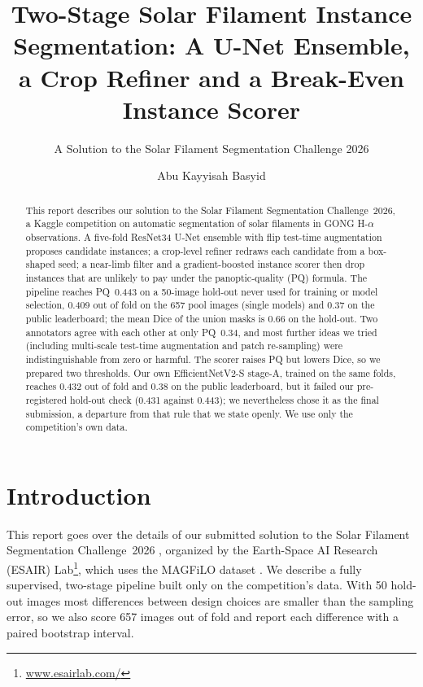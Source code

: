 \documentclass[sigconf]{acmart}
\begin{document}
\title[Two-Stage Solar Filament Segmentation]{Two-Stage Solar Filament Instance Segmentation: A U-Net Ensemble, a Crop Refiner and a Break-Even Instance Scorer}
\subtitle{A Solution to the Solar Filament Segmentation Challenge 2026} %

\author{Abu Kayyisah Basyid}

\begin{abstract}
    This report describes our solution to the Solar Filament Segmentation Challenge~2026, a Kaggle competition on automatic segmentation of solar filaments in GONG H-$\alpha$ observations.
    A five-fold ResNet34 U-Net ensemble with flip test-time augmentation proposes candidate instances; a crop-level refiner redraws each candidate from a box-shaped seed; a near-limb filter and a gradient-boosted instance scorer then drop instances that are unlikely to pay under the panoptic-quality (PQ) formula. The pipeline reaches PQ~0.443 on a 50-image hold-out never used for training or model selection, 0.409 out of fold on the 657 pool images (single models) and 0.37 on the public leaderboard; the mean Dice of the union masks is 0.66 on the hold-out. Two annotators agree with each other at only PQ~0.34, and most further ideas we tried (including multi-scale test-time augmentation and patch re-sampling) were indistinguishable from zero or harmful. The scorer raises PQ but lowers Dice, so we prepared two thresholds. Our own EfficientNetV2-S stage-A, trained on the same folds, reaches 0.432 out of fold and 0.38 on the public leaderboard, but it failed our pre-registered hold-out check (0.431 against 0.443); we nevertheless chose it as the final submission, a departure from that rule that we state openly. We use only the competition's own data.
\end{abstract}

\maketitle

\section{Introduction}
    This report goes over the details of our submitted solution to the Solar Filament Segmentation Challenge~2026 \cite{filament-segmentation-2026}, organized by the Earth-Space AI Research (ESAIR) Lab\footnote{\href{https://www.esairlab.com/home}{www.esairlab.com/}}, which uses the MAGFiLO dataset \cite{ahmadzadeh2024dataset}.
    We describe a fully supervised, two-stage pipeline built only on the competition's data. With 50 hold-out images most differences between design choices are smaller than the sampling error, so we also score 657 images out of fold and report each difference with a paired bootstrap interval.
\end{document}
